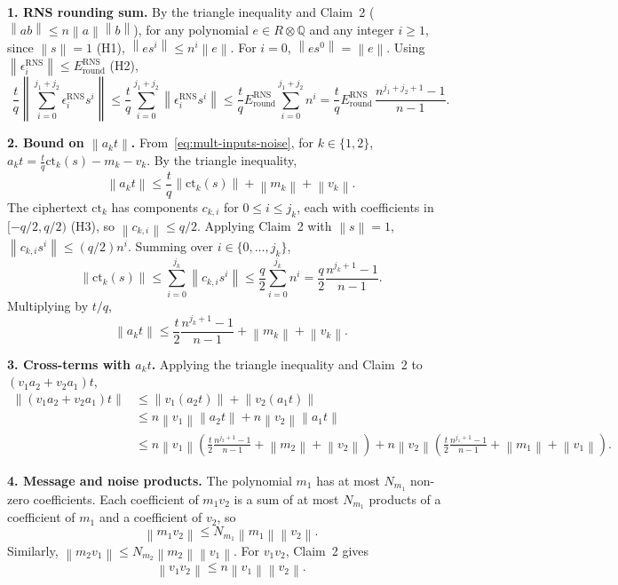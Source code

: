 \documentclass[11pt]{article}
\newcommand{\norm}[1]{\left\lVert #1\right\rVert}
\newcommand{\ct}{\mathrm{ct}}
\newcommand{\Sgeo}[1]{\frac{n^{#1+1}-1}{n-1}}            %
\theoremstyle{plain}
\theoremstyle{definition}
\theoremstyle{remark}
\begin{document}
\textbf{1. RNS rounding sum.}
By the triangle inequality and Claim~2 ($\norm{ab}\leq n\norm{a}\norm{b}$), for any polynomial
$e\in R\otimes\mathbb{Q}$ and any integer $i\geq 1$, since $\norm{s}=1$ (H1),
$\norm{es^i}\leq n^i\norm{e}$. For $i=0$, $\norm{es^0}=\norm{e}$.
Using $\norm{\epsilon_i^{\mathrm{RNS}}}\leq E_{\mathrm{round}}^{\mathrm{RNS}}$ (H2),
\begin{equation}
 \frac{t}{q}\left\lVert\sum_{i=0}^{j_1+j_2}\epsilon_i^{\mathrm{RNS}}s^i\right\rVert
 \leq \frac{t}{q}\sum_{i=0}^{j_1+j_2}\norm{\epsilon_i^{\mathrm{RNS}}s^i}
 \leq \frac{t}{q}E_{\mathrm{round}}^{\mathrm{RNS}}\sum_{i=0}^{j_1+j_2}n^i
 = \frac{t}{q}E_{\mathrm{round}}^{\mathrm{RNS}}\,\Sgeo{j_1+j_2}.
 \label{eq:mult-rns-rounding-bound}
\end{equation}

\textbf{2. Bound on $\norm{a_k t}$.}
From~\eqref{eq:mult-inputs-noise}, for $k\in\{1,2\}$,
$a_kt = \frac{t}{q}\ct_k(s) - m_k - v_k$.
By the triangle inequality,
\[
 \norm{a_kt} \leq \frac{t}{q}\norm{\ct_k(s)} + \norm{m_k} + \norm{v_k}.
\]
The ciphertext $\ct_k$ has components $c_{k,i}$ for $0\leq i\leq j_k$, each with coefficients in
$[-q/2, q/2)$ (H3), so $\norm{c_{k,i}}\leq q/2$.
Applying Claim~2 with $\norm{s}=1$, $\norm{c_{k,i}s^i}\leq (q/2)n^i$.
Summing over $i\in\{0,\dots,j_k\}$,
\[
 \norm{\ct_k(s)} \leq \sum_{i=0}^{j_k}\norm{c_{k,i}s^i}
 \leq \frac{q}{2}\sum_{i=0}^{j_k}n^i
 = \frac{q}{2}\Sgeo{j_k}.
\]
Multiplying by $t/q$,
\begin{equation}
 \norm{a_kt} \leq \frac{t}{2}\Sgeo{j_k} + \norm{m_k} + \norm{v_k}.
 \label{eq:mult-akt-bound}
\end{equation}

\textbf{3. Cross-terms with $a_k t$.}
Applying the triangle inequality and Claim~2 to $(v_1a_2+v_2a_1)t$,
\begin{align*}
\norm{(v_1a_2+v_2a_1)t}
&\leq \norm{v_1(a_2t)} + \norm{v_2(a_1t)}\\
&\leq n\norm{v_1}\norm{a_2t} + n\norm{v_2}\norm{a_1t}\\
&\leq n\norm{v_1}\left(\frac{t}{2}\Sgeo{j_2} + \norm{m_2} + \norm{v_2}\right)
     + n\norm{v_2}\left(\frac{t}{2}\Sgeo{j_1} + \norm{m_1} + \norm{v_1}\right).
\end{align*}

\textbf{4. Message and noise products.}
The polynomial $m_1$ has at most $N_{m_1}$ non-zero coefficients.
Each coefficient of $m_1v_2$ is a sum of at most $N_{m_1}$ products of a coefficient of $m_1$
and a coefficient of $v_2$, so
\[
 \norm{m_1v_2}\leq N_{m_1}\norm{m_1}\norm{v_2}.
\]
Similarly, $\norm{m_2v_1}\leq N_{m_2}\norm{m_2}\norm{v_1}$.
For $v_1v_2$, Claim~2 gives
\[
 \norm{v_1v_2}\leq n\norm{v_1}\norm{v_2}.
\]
\end{document}
